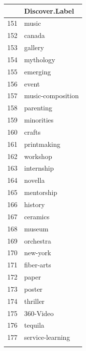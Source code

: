 \documentclass[]{report}   %
\begin{document}
\begin{figure}
\begin{minipage}{0.24\textwidth}
\begin{tabular}[t]{rl}
  \hline
 & Discover.Label \\ 
  \hline
  151 & music \\ 
  152 & canada \\ 
  153 & gallery \\ 
  154 & mythology \\ 
  155 & emerging \\ 
  156 & event \\ 
  157 & music-composition \\ 
  158 & parenting \\ 
  159 & minorities \\ 
  160 & crafts \\ 
  161 & printmaking \\ 
  162 & workshop \\ 
  163 & internship \\ 
  164 & novella \\ 
  165 & mentorship \\ 
  166 & history \\ 
  167 & ceramics \\ 
  168 & museum \\ 
  169 & orchestra \\ 
  170 & new-york \\ 
  171 & fiber-arts \\ 
  172 & paper \\ 
  173 & poster \\ 
  174 & thriller \\ 
  175 & 360-Video \\ 
  176 & tequila \\ 
  177 & service-learning \\ 
   \hline
\vspace{9.26cm}
\end{tabular}

    \end{minipage}
\end{figure}
\end{document}
